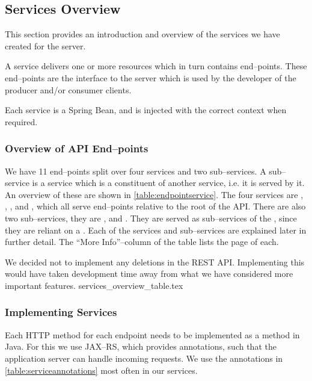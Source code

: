 \subsection{Services Overview}
This section provides an introduction and overview of the services we have created for the server.

A service delivers one or more resources which in turn contains end--points.
These end--points are the interface to the server which is used by the developer of the producer and/or consumer clients.

Each service is a Spring Bean, and is injected with the correct context when required. 

\subsubsection*{Overview of API End--points}
We have 11 end--points split over four services and two sub--services.
A sub--service is a service which is a constituent of another service, i.e. it is served by it.
An overview of these are shown in \cref{table:endpointservice}.
The four services are , , , and , 
which all serve end--points relative to the root of the API.
There are also two sub--services, they are , and .
They are served as sub--services of the , since they are reliant on a .
Each of the services and sub--services are explained later in further detail.
The ``More Info''--column of the table lists the page of each.

We decided not to implement any deletions in the REST API.
Implementing this would have taken development time away from what we have considered more important features. 
{services_overview_table.tex}

\subsubsection*{Implementing Services}
Each HTTP method for each endpoint needs to be implemented as a method in Java.
For this we use JAX--RS, which provides annotations, such that the application server can handle incoming requests.
We use the annotations in \cref{table:serviceannotations} most often in our services.

